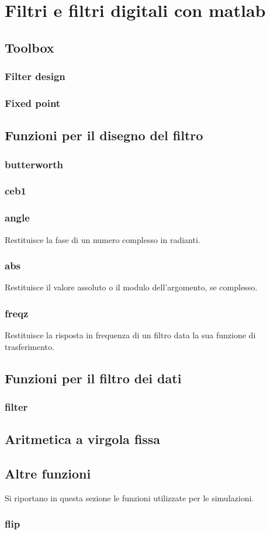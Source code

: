 
\chapter{Filtri e filtri digitali con matlab}
\label{Appendix3}


\section{Toolbox}
\subsection{Filter design}
\subsection{Fixed point}


\section{Funzioni per il disegno del filtro}
\subsection{butterworth}
\subsection{ceb1}

\subsection{angle}
Restituisce la fase di un numero complesso in radianti.

\subsection{abs}
Restituisce il valore assoluto o il modulo dell'argomento, se complesso.

\subsection{freqz}
Restituisce la risposta in frequenza di un filtro data la sua funzione di trasferimento.


\section{Funzioni per il filtro dei dati}
\subsection{filter}


\section{Aritmetica a virgola fissa}


\section{Altre funzioni}
Si riportano in questa sezione le funzioni utilizzate per le simulazioni.

\subsection{flip}
